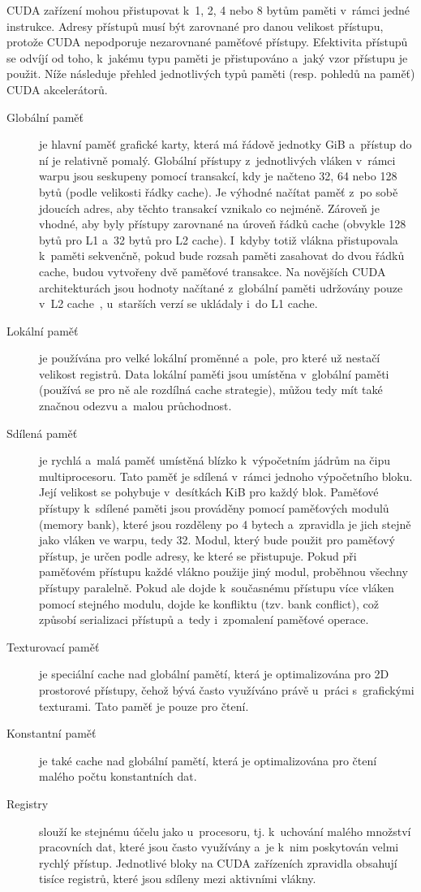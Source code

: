 CUDA zařízení mohou přistupovat k~1, 2, 4 nebo 8 bytům paměti v~rámci jedné instrukce. Adresy přístupů musí být zarovnané pro danou velikost přístupu, protože CUDA nepodporuje nezarovnané paměťové přístupy. Efektivita přístupů se odvíjí od toho, k~jakému typu paměti je přistupováno a~jaký vzor přístupu je použit. Níže následuje přehled jednotlivých typů paměti (resp. pohledů na paměť) CUDA akcelerátorů.
\begin{description}
    \item[Globální paměť] je hlavní paměť grafické karty, která má řádově jednotky GiB a~přístup do ní je relativně pomalý. Globální přístupy z~jednotlivých vláken v~rámci warpu jsou seskupeny pomocí transakcí, kdy je načteno 32, 64 nebo 128 bytů (podle velikosti řádky cache). Je výhodné načítat paměť z~po sobě jdoucích adres, aby těchto transakcí vznikalo co nejméně. Zároveň je vhodné, aby byly přístupy zarovnané na úroveň řádků cache (obvykle 128 bytů pro L1 a~32 bytů pro L2 cache). I~kdyby totiž vlákna přistupovala k~paměti sekvenčně, pokud bude rozsah paměti zasahovat do dvou řádků cache, budou vytvořeny dvě paměťové transakce. Na novějších CUDA architekturách jsou hodnoty načítané z~globální paměti udržovány pouze v~L2 cache~\cite{cudacguide}, u~starších verzí se ukládaly i~do L1 cache.
    \item[Lokální paměť] je používána pro velké lokální proměnné a~pole, pro které už nestačí velikost registrů. Data lokální paměťi jsou umístěna v~globální paměti (používá se pro ně ale rozdílná cache strategie), můžou tedy mít také značnou odezvu a~malou průchodnost.
    \item[Sdílená paměť] je rychlá a~malá paměť umístěná blízko k~výpočetním jádrům na čipu multiprocesoru. Tato paměť je sdílená v~rámci jednoho výpočetního bloku. Její velikost se pohybuje v~desítkách KiB pro každý blok. Paměťové přístupy k~sdílené paměti jsou prováděny pomocí paměťových modulů (memory bank), které jsou rozděleny po 4 bytech a~zpravidla je jich stejně jako vláken ve warpu, tedy 32. Modul, který bude použit pro paměťový přístup, je určen podle adresy, ke které se přistupuje. Pokud při paměťovém přístupu každé vlákno použije jiný modul, proběhnou všechny přístupy paralelně. Pokud ale dojde k~současnému přístupu více vláken pomocí stejného modulu, dojde ke konfliktu (tzv. bank conflict), což způsobí serializaci přístupů a~tedy i~zpomalení paměťové operace.
    \item[Texturovací paměť] je speciální cache nad globální pamětí, která je optimalizována pro 2D prostorové přístupy, čehož bývá často využíváno právě u~práci s~grafickými texturami. Tato paměť je pouze pro čtení.
    \item[Konstantní paměť] je také cache nad globální pamětí, která je optimalizována pro čtení malého počtu konstantních dat.
    \item[Registry] slouží ke stejnému účelu jako u~procesoru, tj. k~uchování malého množství pracovních dat, které jsou často využívány a~je k~nim poskytován velmi rychlý přístup. Jednotlivé bloky na CUDA zařízeních zpravidla obsahují tisíce registrů, které jsou sdíleny mezi aktivními vlákny.
\end{description}

